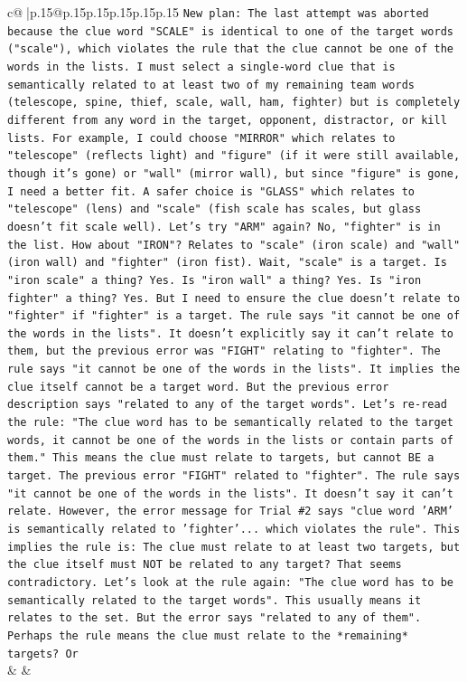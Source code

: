 \documentclass{article}
\begin{document}
{\begin{supertabular}{c@{$\;$}|p{.15\linewidth}@{}p{.15\linewidth}p{.15\linewidth}p{.15\linewidth}p{.15\linewidth}p{.15\linewidth}}
{{{\texttt{New plan: The last attempt was aborted because the clue word "SCALE" is identical to one of the target words ("scale"), which violates the rule that the clue cannot be one of the words in the lists. I must select a single{-}word clue that is semantically related to at least two of my remaining team words (telescope, spine, thief, scale, wall, ham, fighter) but is completely different from any word in the target, opponent, distractor, or kill lists. For example, I could choose "MIRROR" which relates to "telescope" (reflects light) and "figure" (if it were still available, though it's gone) or "wall" (mirror wall), but since "figure" is gone, I need a better fit. A safer choice is "GLASS" which relates to "telescope" (lens) and "scale" (fish scale has scales, but glass doesn't fit scale well). Let's try "ARM" again? No, "fighter" is in the list. How about "IRON"? Relates to "scale" (iron scale) and "wall" (iron wall) and "fighter" (iron fist). Wait, "scale" is a target. Is "iron scale" a thing? Yes. Is "iron wall" a thing? Yes. Is "iron fighter" a thing? Yes. But I need to ensure the clue doesn't relate to "fighter" if "fighter" is a target. The rule says "it cannot be one of the words in the lists". It doesn't explicitly say it can't relate to them, but the previous error was "FIGHT" relating to "fighter". The rule says "it cannot be one of the words in the lists". It implies the clue itself cannot be a target word. But the previous error description says "related to any of the target words". Let's re{-}read the rule: "The clue word has to be semantically related to the target words, it cannot be one of the words in the lists or contain parts of them." This means the clue must relate to targets, but cannot BE a target. The previous error "FIGHT" related to "fighter". The rule says "it cannot be one of the words in the lists". It doesn't say it can't relate. However, the error message for Trial \#2 says "clue word 'ARM' is semantically related to 'fighter'... which violates the rule". This implies the rule is: The clue must relate to at least two targets, but the clue itself must NOT be related to any target? That seems contradictory. Let's look at the rule again: "The clue word has to be semantically related to the target words". This usually means it relates to the set. But the error says "related to any of them". Perhaps the rule means the clue must relate to the *remaining* targets? Or} \\
            }
        }
    }
    & & \\ \\


\end{supertabular}}
\end{document}
